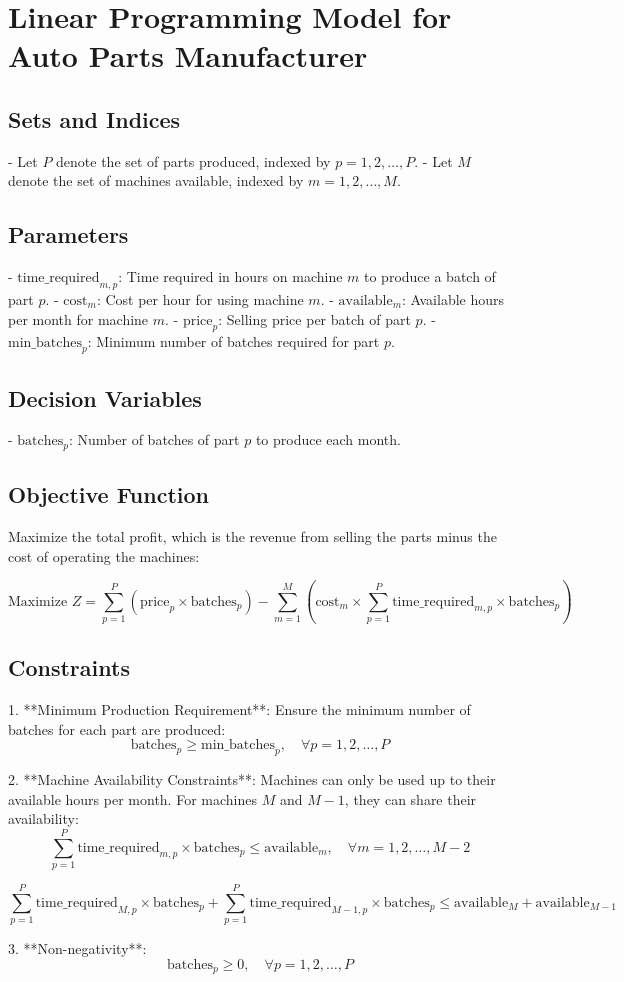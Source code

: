 \documentclass{article}
\begin{document}
\section*{Linear Programming Model for Auto Parts Manufacturer}

\subsection*{Sets and Indices}
- Let \( P \) denote the set of parts produced, indexed by \( p = 1, 2, \ldots, P \).
- Let \( M \) denote the set of machines available, indexed by \( m = 1, 2, \ldots, M \).

\subsection*{Parameters}
- \( \text{time\_required}_{m,p} \): Time required in hours on machine \( m \) to produce a batch of part \( p \).
- \( \text{cost}_{m} \): Cost per hour for using machine \( m \).
- \( \text{available}_{m} \): Available hours per month for machine \( m \).
- \( \text{price}_{p} \): Selling price per batch of part \( p \).
- \( \text{min\_batches}_{p} \): Minimum number of batches required for part \( p \).

\subsection*{Decision Variables}
- \( \text{batches}_{p} \): Number of batches of part \( p \) to produce each month.

\subsection*{Objective Function}
Maximize the total profit, which is the revenue from selling the parts minus the cost of operating the machines:

\[
\text{Maximize } Z = \sum_{p=1}^{P} (\text{price}_{p} \times \text{batches}_{p}) - \sum_{m=1}^{M} (\text{cost}_{m} \times \sum_{p=1}^{P} \text{time\_required}_{m,p} \times \text{batches}_{p})
\]

\subsection*{Constraints}

1. **Minimum Production Requirement**: Ensure the minimum number of batches for each part are produced:
   \[
   \text{batches}_{p} \geq \text{min\_batches}_{p}, \quad \forall p = 1, 2, \ldots, P
   \]

2. **Machine Availability Constraints**: Machines can only be used up to their available hours per month. For machines \( M \) and \( M-1 \), they can share their availability:
   \[
   \sum_{p=1}^{P} \text{time\_required}_{m,p} \times \text{batches}_{p} \leq \text{available}_{m}, \quad \forall m = 1, 2, \ldots, M-2
   \]

   \[
   \sum_{p=1}^{P} \text{time\_required}_{M,p} \times \text{batches}_{p} + \sum_{p=1}^{P} \text{time\_required}_{M-1,p} \times \text{batches}_{p} \leq \text{available}_{M} + \text{available}_{M-1}
   \]

3. **Non-negativity**: 
   \[
   \text{batches}_{p} \geq 0, \quad \forall p = 1, 2, \ldots, P
   \]
\end{document}
